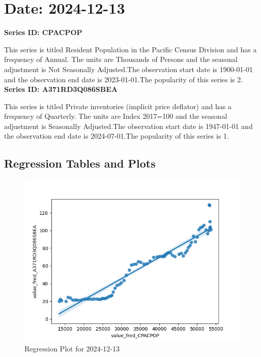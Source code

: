 \section{Date: 2024-12-13}
\noindent \textbf{Series ID: CPACPOP} 

\noindent This series is titled Resident Population in the Pacific Census Division and has a frequency of Annual. The units are Thousands of Persons and the seasonal adjustment is Not Seasonally Adjusted.The observation start date is 1900-01-01 and the observation end date is 2023-01-01.The popularity of this series is 2. \\ 

\noindent \textbf{Series ID: A371RD3Q086SBEA} 

\noindent This series is titled Private inventories (implicit price deflator) and has a frequency of Quarterly. The units are Index 2017=100 and the seasonal adjustment is Seasonally Adjusted.The observation start date is 1947-01-01 and the observation end date is 2024-07-01.The popularity of this series is 1. \\ 

\subsection{Regression Tables and Plots}


\begin{figure}
\centering
\includegraphics[scale = 0.9]{plots/plot_2024-12-13.png}
\caption{Regression Plot for 2024-12-13}
\end{figure}
\newpage
